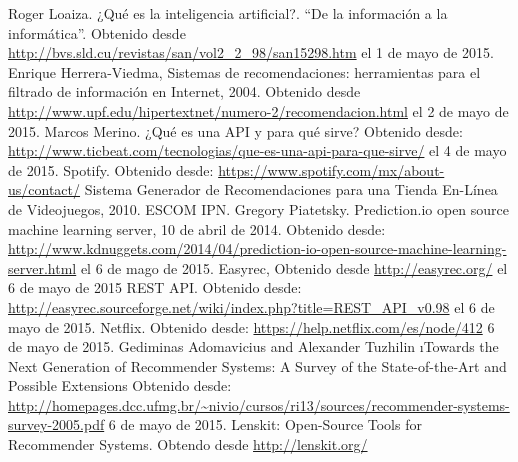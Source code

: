 \begin{thebibliography}{1}

    Roger Loaiza. ¿Qué es la inteligencia artificial?. “De la información a la informática”. Obtenido desde \url{http://bvs.sld.cu/revistas/san/vol2_2_98/san15298.htm} el 1 de mayo de 2015.
    Enrique Herrera-Viedma, Sistemas de recomendaciones: herramientas para el filtrado de información en Internet, 2004. Obtenido desde \url{http://www.upf.edu/hipertextnet/numero-2/recomendacion.html} el 2 de mayo de 2015. 
     Marcos Merino. ¿Qué es una API y para qué sirve? Obtenido desde: \url{http://www.ticbeat.com/tecnologias/que-es-una-api-para-que-sirve/} el 4 de mayo de 2015. 
     Spotify. Obtenido desde: \url{https://www.spotify.com/mx/about-us/contact/}
     Sistema Generador de Recomendaciones para una Tienda En-Línea de Videojuegos, 2010. ESCOM IPN. 
    Gregory Piatetsky. Prediction.io open source machine learning server, 10 de abril de 2014. Obtenido desde: \url{http://www.kdnuggets.com/2014/04/prediction-io-open-source-machine-learning-server.html} el 6 de mago de 2015. 
    Easyrec, Obtenido desde \url{http://easyrec.org/} el 6 de mayo de 2015 
    REST API. Obtenido desde: \url{http://easyrec.sourceforge.net/wiki/index.php?title=REST_API_v0.98} el 6 de mayo de 2015. 
    Netflix. Obtenido desde: \url{https://help.netflix.com/es/node/412} 6 de mayo de 2015.
    Gediminas Adomavicius and Alexander Tuzhilin \i{Towards the Next Generation of Recommender Systems: A Survey of the State-of-the-Art and Possible Extensions} Obtenido desde: \url{http://homepages.dcc.ufmg.br/~nivio/cursos/ri13/sources/recommender-systems-survey-2005.pdf} 6 de mayo de 2015.
    Lenskit: Open-Source Tools for Recommender Systems. Obtendo desde \url{http://lenskit.org/}

\end{thebibliography}
